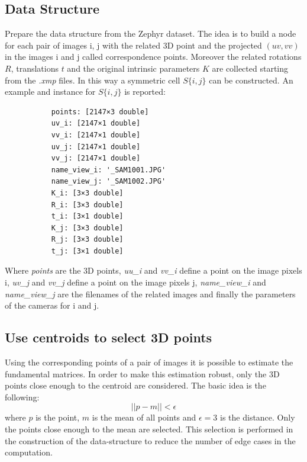 \documentclass[11pt]{article}
\begin{document}
\subsection{Data Structure}
Prepare the data structure from the Zephyr dataset. The idea is to build a node for each pair of images i, j with the related 3D point and the projected $(uv,vv)$ in the images i and j called correspondence points. Moreover the related rotations $R$, translations $t$ and the original intrinsic parameters $K$ are collected starting from the \textit{.xmp} files. In this way a symmetric cell $S\{i,j\}$ can be constructed. An example and instance for $S\{i,j\}$ is reported:
\begin{verbatim}
           points: [2147×3 double]
           uv_i: [2147×1 double]
           vv_i: [2147×1 double]
           uv_j: [2147×1 double]
           vv_j: [2147×1 double]
           name_view_i: '_SAM1001.JPG'
           name_view_j: '_SAM1002.JPG'
           K_i: [3×3 double]
           R_i: [3×3 double]
           t_i: [3×1 double]
           K_j: [3×3 double]
           R_j: [3×3 double]
           t_j: [3×1 double]
\end{verbatim}
Where \textit{points} are the 3D points, \textit{uu\_i} and \textit{vv\_i} define a point on the image pixels i, \textit{uv\_j} and \textit{vv\_j} define a point on the image pixels j, \textit{name\_view\_i} and \textit{name\_view\_j} are the filenames of the related images and finally the parameters of the cameras for i and j.

\subsection{Use centroids to select 3D points}
Using the corresponding points of a pair of images it is possible to estimate the fundamental matrices. In order to make this estimation robust, only the 3D points close enough to the centroid are considered. The basic idea is the following:
\begin{equation}
    || p - m || < \epsilon
\end{equation}
where $p$ is the point, $m$ is the mean of all points and $\epsilon = 3$ is the distance. Only the points close enough to the mean are selected. This selection is performed in the construction of the data-structure to reduce the number of edge cases in the computation.
\end{document}
